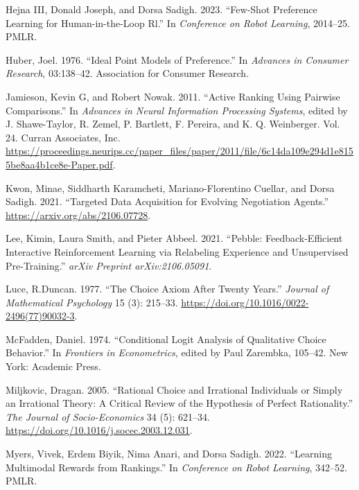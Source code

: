 \documentclass[
  letterpaper,
  numbers=noenddot,
  DIV=11]{scrreprt}
\newlength{\cslhangindent}
\newenvironment{CSLReferences}[2] %
 {\begin{list}{}{%
  \setlength{\itemindent}{0pt}
  \setlength{\leftmargin}{0pt}
  \setlength{\parsep}{0pt}
  \ifodd #1
   \setlength{\leftmargin}{\cslhangindent}
   \setlength{\itemindent}{-1\cslhangindent}
  \fi
  \setlength{\itemsep}{#2\baselineskip}}}
 {\end{list}}
\theoremstyle{definition}
\theoremstyle{plain}
\theoremstyle{plain}
\theoremstyle{remark}
\begin{document}
\begin{CSLReferences}{1}{0}
Hejna III, Donald Joseph, and Dorsa Sadigh. 2023. {``Few-Shot Preference
Learning for Human-in-the-Loop Rl.''} In \emph{Conference on Robot
Learning}, 2014--25. PMLR.

Huber, Joel. 1976. {``Ideal Point Models of Preference.''} In
\emph{Advances in Consumer Research}, 03:138--42. Association for
Consumer Research.

Jamieson, Kevin G, and Robert Nowak. 2011. {``Active Ranking Using
Pairwise Comparisons.''} In \emph{Advances in Neural Information
Processing Systems}, edited by J. Shawe-Taylor, R. Zemel, P. Bartlett,
F. Pereira, and K. Q. Weinberger. Vol. 24. Curran Associates, Inc.
\url{https://proceedings.neurips.cc/paper_files/paper/2011/file/6c14da109e294d1e8155be8aa4b1ce8e-Paper.pdf}.

Kwon, Minae, Siddharth Karamcheti, Mariano-Florentino Cuellar, and Dorsa
Sadigh. 2021. {``Targeted Data Acquisition for Evolving Negotiation
Agents.''} \url{https://arxiv.org/abs/2106.07728}.

Lee, Kimin, Laura Smith, and Pieter Abbeel. 2021. {``Pebble:
Feedback-Efficient Interactive Reinforcement Learning via Relabeling
Experience and Unsupervised Pre-Training.''} \emph{arXiv Preprint
arXiv:2106.05091}.

Luce, R.Duncan. 1977. {``The Choice Axiom After Twenty Years.''}
\emph{Journal of Mathematical Psychology} 15 (3): 215--33.
\url{https://doi.org/10.1016/0022-2496(77)90032-3}.

McFadden, Daniel. 1974. {``Conditional Logit Analysis of Qualitative
Choice Behavior.''} In \emph{Frontiers in Econometrics}, edited by Paul
Zarembka, 105--42. New York: Academic Press.

Miljkovic, Dragan. 2005. {``Rational Choice and Irrational Individuals
or Simply an Irrational Theory: A Critical Review of the Hypothesis of
Perfect Rationality.''} \emph{The Journal of Socio-Economics} 34 (5):
621--34. \url{https://doi.org/10.1016/j.socec.2003.12.031}.

Myers, Vivek, Erdem Biyik, Nima Anari, and Dorsa Sadigh. 2022.
{``Learning Multimodal Rewards from Rankings.''} In \emph{Conference on
Robot Learning}, 342--52. PMLR.


\end{CSLReferences}
\end{document}
